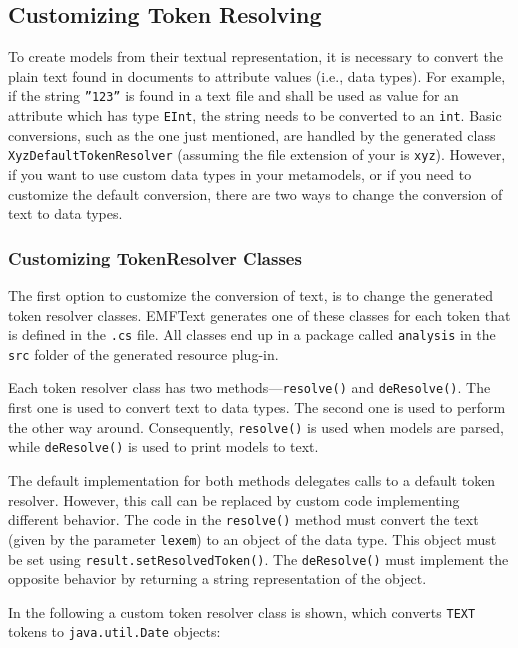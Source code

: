 \subsection{Customizing Token Resolving}
\label{sec:cust_token_resolving}

To create models from their textual representation, it is necessary to convert
the plain text found in \DSL documents to attribute values (i.e., data types).
For example, if the string \texttt{''123''} is found in a text file and shall be used as value for an
attribute which has type \texttt{EInt}, the string needs to be converted to an
\texttt{int}. Basic conversions, such as the one just mentioned, are handled by
the generated class \texttt{XyzDefaultTokenResolver} (assuming the file
extension of your \DSL is \texttt{xyz}). However, if you want to use custom data
types in your metamodels, or if you need to customize the default conversion, there
are two ways to change the conversion of text to data types.

\subsubsection{Customizing TokenResolver Classes}

The first option to customize the conversion of text, is to change the generated
token resolver classes. EMFText generates one of these classes for each token
that is defined in the \texttt{.cs} file. All classes end up in a package called
\texttt{analysis} in the \texttt{src} folder of the generated resource plug-in.

Each token resolver class has two methods---\texttt{resolve()} and
\texttt{deResolve()}. The first one is used to convert text to data types. The
second one is used to perform the other way around. Consequently,
\texttt{resolve()} is used when models are parsed, while \texttt{deResolve()} is
used to print models to text.

The default implementation for both methods delegates calls to a default token
resolver. However, this call can be replaced by custom code implementing
different behavior. The code in the \texttt{resolve()} method must convert the text
(given by the parameter \texttt{lexem}) to an object of the data type. This
object must be set using \texttt{result.setResolvedToken()}. The
\texttt{deResolve()} must implement the opposite behavior by returning a string 
representation of the object.

In the following a custom token resolver class is shown, which converts
\texttt{TEXT} tokens to \texttt{java.util.Date} objects:

